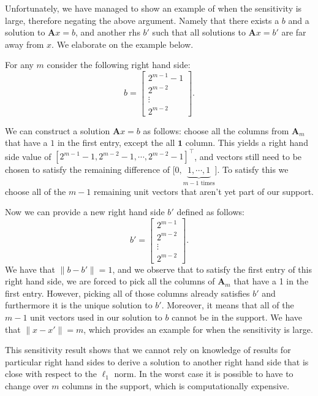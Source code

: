 \documentclass{article}
\newcommand\norm[1]{\lVert#1\rVert}
\begin{document}
Unfortunately, we have managed to show an example of when the sensitivity is large, therefore negating the above argument. Namely that there exists a $b$ and a solution to $\mathbf{A}x = b$, and another rhs $b'$ such that all solutions to $\mathbf{A}x = b'$ are far away from $x$. We elaborate on the example below.

For any $m$ consider the following right hand side:
\[
b = \begin{bmatrix}
2^{m-1}-1 \\ 2^{m-2} \\ \vdots \\ 2^{m-2}
\end{bmatrix}.
\]

We can construct a solution $\mathbf{A}x = b$ as follows: choose all the columns from $\mathbf{A}_m$ that have a $1$ in the first entry, except the all $\mathbf{1}$ column. This yields a right hand side value of $[2^{m-1}-1, 2^{m-2} - 1,  \cdots, 2^{m-2} - 1]^\top$, and vectors still need to be chosen to satisfy the remaining difference of $\big[0, \underbrace{1, \cdots, 1}_{m-1 \text{ times}}\big]$. To satisfy this we choose all of the $m-1$ remaining unit vectors that aren't yet part of our support.

Now we can provide a new right hand side $b'$ defined as follows:
\[
b' = \begin{bmatrix}
2^{m-1} \\ 2^{m-2} \\ \vdots \\ 2^{m-2}
\end{bmatrix}.
\]
We have that $\norm{b - b'} = 1$, and we observe that to satisfy the first entry of this right hand side, we are forced to pick all the columns of $\mathbf{A}_m$ that have a 1 in the first entry. However, picking all of those columns already satisfies $b'$ and furthermore it is the unique solution to $b'$. Moreover, it means that all of the $m-1$ unit vectors used in our solution to $b$ cannot be in the support. We have that $\norm{x - x'} = m$, which provides an example for when the sensitivity is large. 

This sensitivity result shows that we cannot rely on knowledge of results for particular right hand sides to derive a solution to another right hand side that is close with respect to the $\ell_1$ norm. In the worst case it is possible to have to change over $m$ columns in the support, which is computationally expensive. 
\end{document}
